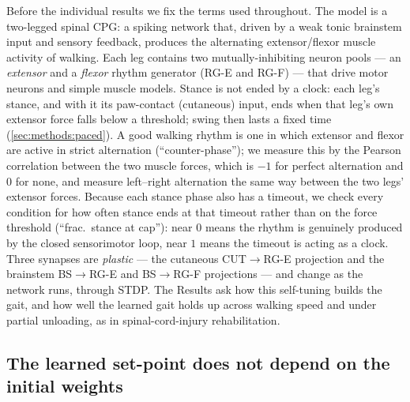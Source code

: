 
Before the individual results we fix the terms used throughout. The model is a
two-legged spinal CPG: a spiking network that, driven by a weak tonic brainstem
input and sensory feedback, produces the alternating extensor/flexor muscle
activity of walking. Each leg contains two mutually-inhibiting neuron pools ---
an \emph{extensor} and a \emph{flexor} rhythm generator (RG-E and RG-F) --- that
drive motor neurons and simple muscle models. Stance is not ended by a clock:
each leg's stance, and with it its paw-contact (cutaneous) input, ends when
that leg's own extensor force falls below a threshold; swing then lasts a
fixed time (\autoref{sec:methods:paced}). A good walking rhythm is one in which extensor
and flexor are active in strict alternation (``counter-phase''); we measure this
by the Pearson correlation between the two muscle forces, which is $-1$ for
perfect alternation and $0$ for none, and measure left--right alternation the
same way between the two legs' extensor forces. Because each stance phase also
has a timeout, we check every condition for how often stance ends at that
timeout rather than on the force threshold (``frac.\ stance at cap''): near $0$
means the rhythm is genuinely produced by the closed sensorimotor loop, near $1$
means the timeout is acting as a clock. Three synapses are \emph{plastic} ---
the cutaneous CUT$\to$RG-E projection and the brainstem BS$\to$RG-E and
BS$\to$RG-F projections --- and change as the network runs, through STDP. The
Results ask how this self-tuning builds the gait, and how well the learned gait
holds up across walking speed and under partial unloading, as in
spinal-cord-injury rehabilitation.

\subsection{The learned set-point does not depend on the initial weights}\label{sec:results:robustness}

